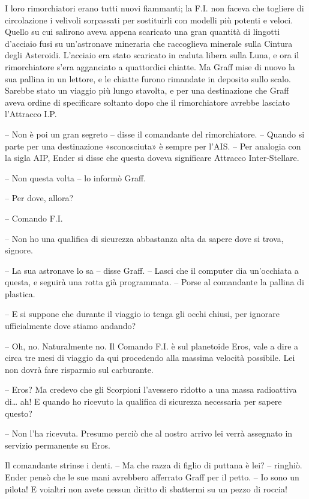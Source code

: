 {I loro rimorchiatori erano tutti nuovi fiammanti; la F.I. non faceva
	che togliere di circolazione i velivoli sorpassati per sostituirli con
	modelli più potenti e veloci. Quello su cui salirono aveva appena
	scaricato una gran quantità di lingotti d'acciaio fusi su un'astronave
	mineraria che raccoglieva minerale sulla Cintura degli Asteroidi.
	L'acciaio era stato scaricato in caduta libera sulla Luna, e ora il
	rimorchiatore s'era agganciato a quattordici chiatte. Ma Graff mise di
	nuovo la sua pallina in un lettore, e le chiatte furono rimandate in
	deposito sullo scalo. Sarebbe stato un viaggio più lungo stavolta, e per
	una destinazione che Graff aveva ordine di specificare soltanto dopo che
	il rimorchiatore avrebbe lasciato l'Attracco I.P.}

{-- Non è poi un gran segreto -- disse il comandante del rimorchiatore.
	-- Quando si parte per una destinazione «sconosciuta» è sempre per
	l'AIS. -- Per analogia con la sigla AIP, Ender si disse che questa
	doveva significare Attracco Inter-Stellare.}

{-- Non questa volta -- lo informò Graff.}

{-- Per dove, allora?}

{-- Comando F.I.}

{-- Non ho una qualifica di sicurezza abbastanza alta da sapere dove si
	trova, signore.}

{-- La sua astronave lo sa -- disse Graff. -- Lasci che il computer dia
	un'occhiata a questa, e seguirà una rotta già programmata. -- Porse al
	comandante la pallina di plastica.}

{-- E si suppone che durante il viaggio io tenga gli occhi chiusi, per
	ignorare ufficialmente dove stiamo andando?}

{-- Oh, no. Naturalmente no. Il Comando F.I. è sul planetoide Eros, vale
	a dire a circa tre mesi di viaggio da qui procedendo alla massima
	velocità possibile. Lei non dovrà fare risparmio sul carburante.}

{-- Eros? Ma credevo che gli Scorpioni l'avessero ridotto a una massa
	radioattiva di\ldots{} ah! E quando ho ricevuto la qualifica di
	sicurezza necessaria per sapere questo?}

{-- Non l'ha ricevuta. Presumo perciò che al nostro arrivo lei verrà
	assegnato in servizio permanente su Eros.}

{Il comandante strinse i denti. -- Ma che razza di figlio di puttana è
	lei? -- ringhiò. Ender pensò che le sue mani avrebbero afferrato Graff
	per il petto. -- Io sono un pilota! E voialtri non avete nessun diritto
	di sbattermi su un pezzo di roccia!}

